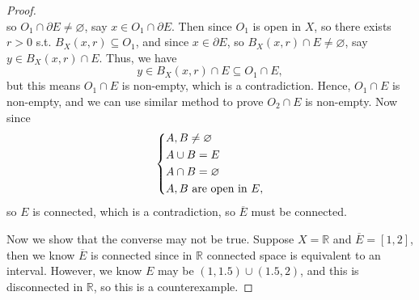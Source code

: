 \begin{proof}
\[    \] so \(O_1 \cap \partial E \neq \varnothing \), say \(x \in O_1 \cap \partial E\). Then since \(O_1\) is open in \(X\), so there exists \(r > 0\) s.t. \(B_X(x, r) \subseteq O_1\), and since \(x \in \partial E\), so \(B_X(x, r) \cap E \neq \varnothing \), say \(y \in B_X(x, r) \cap E\). Thus, we have
    \[
        y \in B_X(x, r) \cap E \subseteq O_1 \cap E,
    \] but this means \(O_1 \cap E\) is non-empty, which is a contradiction. Hence, \(O_1 \cap E\) is non-empty, and we can use similar method to prove \(O_2 \cap E\) is non-empty. Now since 
    \[
        \begin{dcases}
            A, B \neq \varnothing \\
            A \cup B = E \\
            A \cap B = \varnothing \\
            A, B \text{ are open in } E,
        \end{dcases}
    \]   
    so \(E\) is connected, which is a contradiction, so \(\overline{E} \) must be connected. 
    
    Now we show that the converse may not be true. Suppose \(X = \mathbb{R} \) and \(\overline{E} = [1, 2] \), then we know \(\overline{E} \) is connected since in \(\mathbb{R} \) connected space is equivalent to an interval. However, we know \(E\) may be \((1, 1.5) \cup (1.5, 2)\), and this is disconnected in \(\mathbb{R} \), so this is a counterexample.        
    
\end{proof}

